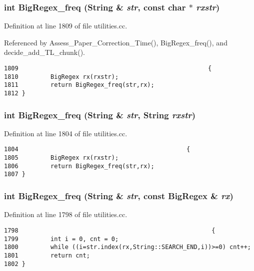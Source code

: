 \subsubsection{\setlength{\rightskip}{0pt plus 5cm}int Big\-Regex\_\-freq ({\bf String} \& {\em str}, const char $\ast$ {\em rxstr})}\label{dil2al_8hh_a215}




Definition at line 1809 of file utilities.cc.

Referenced by Assess\_\-Paper\_\-Correction\_\-Time(), Big\-Regex\_\-freq(), and decide\_\-add\_\-TL\_\-chunk().



\footnotesize\begin{verbatim}1809                                                     {
1810         BigRegex rx(rxstr);
1811         return BigRegex_freq(str,rx);
1812 }
\end{verbatim}\normalsize 
{}
\subsubsection{\setlength{\rightskip}{0pt plus 5cm}int Big\-Regex\_\-freq ({\bf String} \& {\em str}, {\bf String} {\em rxstr})}\label{dil2al_8hh_a214}




Definition at line 1804 of file utilities.cc.



\footnotesize\begin{verbatim}1804                                               {
1805         BigRegex rx(rxstr);
1806         return BigRegex_freq(str,rx);
1807 }
\end{verbatim}\normalsize 
{}
\subsubsection{\setlength{\rightskip}{0pt plus 5cm}int Big\-Regex\_\-freq ({\bf String} \& {\em str}, const {\bf Big\-Regex} \& {\em rx})}\label{dil2al_8hh_a213}




Definition at line 1798 of file utilities.cc.



\footnotesize\begin{verbatim}1798                                                      {
1799         int i = 0, cnt = 0;
1800         while ((i=str.index(rx,String::SEARCH_END,i))>=0) cnt++;
1801         return cnt;
1802 }
\end{verbatim}\normalsize 
{}
